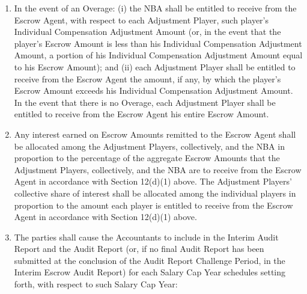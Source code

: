 \documentclass[
]{book}
\providecommand{\tightlist}{%
  \setlength{\itemsep}{0pt}\setlength{\parskip}{0pt}}
\begin{document}
\begin{enumerate}
  \begin{enumerate}
  \def\labelenumii{(\arabic{enumii})}
  \tightlist
  \item
    In the event of an Overage: (i) the NBA shall be entitled to receive from the Escrow Agent, with respect to each Adjustment Player, such player's Individual Compensation Adjustment Amount (or, in the event that the player's Escrow Amount is less than his Individual Compensation Adjustment Amount, a portion of his Individual Compensation Adjustment Amount equal to his Escrow Amount); and (ii) each Adjustment Player shall be entitled to receive from the Escrow Agent the amount, if any, by which the player's Escrow Amount exceeds his Individual Compensation Adjustment Amount. In the event that there is no Overage, each Adjustment Player shall be entitled to receive from the Escrow Agent his entire Escrow Amount.
  \item
    Any interest earned on Escrow Amounts remitted to the Escrow Agent shall be allocated among the Adjustment Players, collectively, and the NBA in proportion to the percentage of the aggregate Escrow Amounts that the Adjustment Players, collectively, and the NBA are to receive from the Escrow Agent in accordance with Section 12(d)(1) above. The Adjustment Players' collective share of interest shall be allocated among the individual players in proportion to the amount each player is entitled to receive from the Escrow Agent in accordance with Section 12(d)(1) above.
  \item
    The parties shall cause the Accountants to include in the Interim Audit Report and the Audit Report (or, if no final Audit Report has been submitted at the conclusion of the Audit Report Challenge Period, in the Interim Escrow Audit Report) for each Salary Cap Year schedules setting forth, with respect to such Salary Cap Year:


\end{enumerate}
\end{enumerate}
\end{document}
